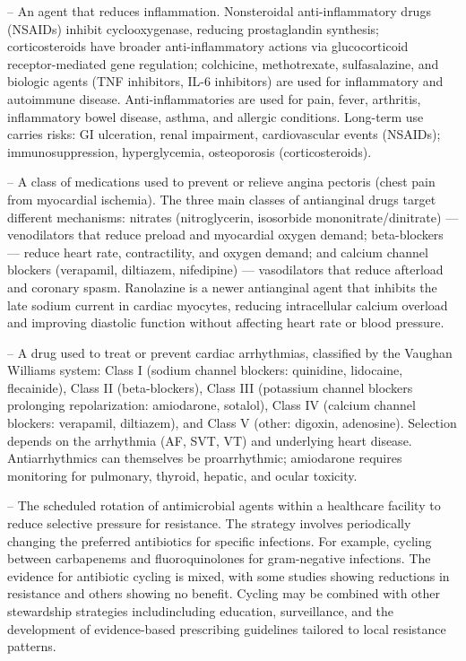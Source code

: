 -- An agent that reduces inflammation. Nonsteroidal anti-inflammatory drugs (NSAIDs) inhibit cyclooxygenase, reducing prostaglandin synthesis; corticosteroids have broader anti-inflammatory actions via glucocorticoid receptor-mediated gene regulation; colchicine, methotrexate, sulfasalazine, and biologic agents (TNF inhibitors, IL-6 inhibitors) are used for inflammatory and autoimmune disease. Anti-inflammatories are used for pain, fever, arthritis, inflammatory bowel disease, asthma, and allergic conditions. Long-term use carries risks: GI ulceration, renal impairment, cardiovascular events (NSAIDs); immunosuppression, hyperglycemia, osteoporosis (corticosteroids).

-- A class of medications used to prevent or relieve angina pectoris (chest pain from myocardial ischemia). The three main classes of antianginal drugs target different mechanisms: nitrates (nitroglycerin, isosorbide mononitrate/dinitrate) — venodilators that reduce preload and myocardial oxygen demand; beta-blockers — reduce heart rate, contractility, and oxygen demand; and calcium channel blockers (verapamil, diltiazem, nifedipine) — vasodilators that reduce afterload and coronary spasm. Ranolazine is a newer antianginal agent that inhibits the late sodium current in cardiac myocytes, reducing intracellular calcium overload and improving diastolic function without affecting heart rate or blood pressure.

-- A drug used to treat or prevent cardiac arrhythmias, classified by the Vaughan Williams system: Class I (sodium channel blockers: quinidine, lidocaine, flecainide), Class II (beta-blockers), Class III (potassium channel blockers prolonging repolarization: amiodarone, sotalol), Class IV (calcium channel blockers: verapamil, diltiazem), and Class V (other: digoxin, adenosine). Selection depends on the arrhythmia (AF, SVT, VT) and underlying heart disease. Antiarrhythmics can themselves be proarrhythmic; amiodarone requires monitoring for pulmonary, thyroid, hepatic, and ocular toxicity.

-- The scheduled rotation of antimicrobial agents within a healthcare facility to reduce selective pressure for resistance. The strategy involves periodically changing the preferred antibiotics for specific infections. For example, cycling between carbapenems and fluoroquinolones for gram-negative infections. The evidence for antibiotic cycling is mixed, with some studies showing reductions in resistance and others showing no benefit. Cycling may be combined with other stewardship strategies includincluding education, surveillance, and the development of evidence-based prescribing guidelines tailored to local resistance patterns.


